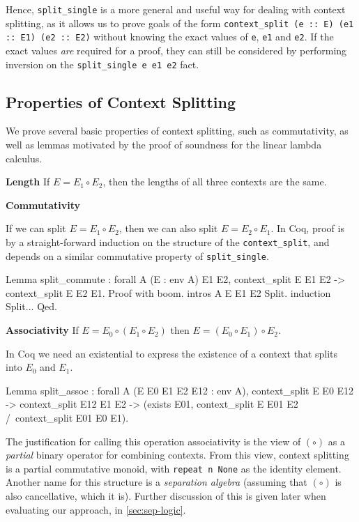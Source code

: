 \documentclass[]{unswthesis}
\let\c\texttt
\let\i\textit
\begin{document}
Hence, \c{split_single} is a more general and useful way for dealing with context splitting, as it allows us to prove goals of the form \c{context_split (e :: E) (e1 :: E1) (e2 :: E2)} without knowing the exact values of \c{e}, \c{e1} and \c{e2}. If the exact values \i{are} required for a proof, they can still be considered by performing inversion on the \c{split_single e e1 e2} fact.

\subsection{Properties of Context Splitting}

We prove several basic properties of context splitting, such as commutativity, as well as lemmas motivated by the proof of soundness for the linear lambda calculus.

\textbf{Length} If $E = E_1 \circ E_2$, then the lengths of all three contexts are the same.

\textbf{Commutativity}

If we can split $E = E_1 \circ E_2$, then we can also split $E = E_2 \circ E_1$. In Coq, proof is by a straight-forward induction on the structure of the \c{context_split}, and depends on a similar commutative property of \c{split_single}.

\begin{coqcode}
Lemma split_commute : forall A (E : env A) E1 E2,
  context_split E E1 E2 -> context_split E E2 E1.
Proof with boom.
  intros A E E1 E2 Split.
  induction Split...
Qed.
\end{coqcode}

\textbf{Associativity} If $E = E_0 \circ (E_1 \circ E_2)$ then $E = (E_0 \circ E_1) \circ E_2$.

In Coq we need an existential to express the existence of a context that splits into $E_0$ and $E_1$.

\begin{coqcode}
Lemma split_assoc : forall A (E E0 E1 E2 E12 : env A),
  context_split E E0 E12 ->
  context_split E12 E1 E2 ->
  (exists E01, context_split E E01 E2 /\ context_split E01 E0 E1).
\end{coqcode}

The justification for calling this operation associativity is the view of $(\circ)$ as a \i{partial} binary operator for combining contexts. From this view, context splitting is a partial commutative monoid, with \c{repeat n None} as the identity element. Another name for this structure is a \i{separation algebra} (assuming that $(\circ)$ is also cancellative, which it is). Further discussion of this is given later when evaluating our approach, in \cref{sec:sep-logic}.
\end{document}
